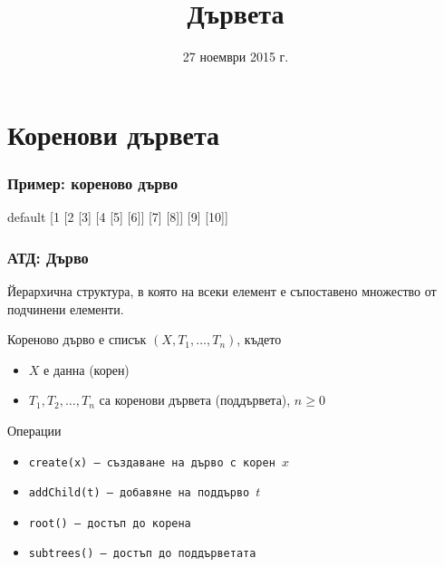 \documentclass{beamer}
\title{Дървета}
\date{27 ноември 2015 г.}
\newcommand{\sampletree}{%
  \begin{forest} default
    [1 [2 [3] [4 [5] [6]] [7] [8]] [9] [10]]
  \end{forest}%
}
\begin{document}
\begin{frame}
  \titlepage
\end{frame}

\section{Коренови дървета}

\begin{frame}
  \frametitle{Пример: кореново дърво}
  \begin{center}
    \sampletree
  \end{center}
\end{frame}

\begin{frame}
  \frametitle{АТД: Дърво}
  Йерархична структура, в която на всеки елемент е съпоставено множество от подчинени елементи.
  \begin{definition}
    Кореново дърво е списък $(X, T_1, \ldots, T_n)$, където
    \begin{itemize}
    \item $X$ е данна (корен)
    \item $T_1, T_2, \ldots, T_n$ са коренови дървета (поддървета)\pause, \alert{$n\geq 0$}
    \end{itemize}
  \end{definition}
  \pause
  Операции
  \begin{itemize}
  \item \tt{create(x)} --- създаване на дърво с корен $x$
  \item \tt{addChild(t)} --- добавяне на поддърво $t$
  \item \tt{root()} --- достъп до корена
  \item \tt{subtrees()} --- достъп до поддърветата
  \end{itemize}
\end{frame}
\end{document}
